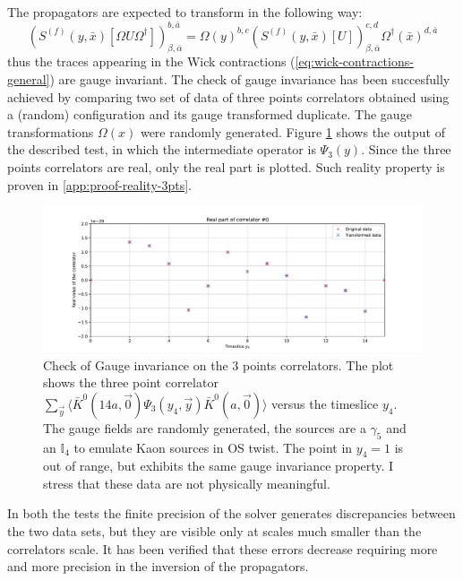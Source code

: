 \documentclass[english, LaM, oneside, noexaminfo]{sapthesis}
\newcommand{\la}{\langle}
\newcommand{\ra}{\rangle}
\begin{document}
The propagators are expected to transform in the following way:
\begin{equation*}
    \left(S^{(f)}(y, \bar x)[\Omega U \Omega^\dagger]\right)^{b,\bar a}_{\beta, \bar \alpha} = \Omega (y)^{b,c} \left(S^{(f)}(y, \bar x)[U]\right)^{c,d}_{\beta, \bar \alpha} \Omega^\dagger (\bar x)^{d,\bar a}
\end{equation*}
thus the traces appearing in the Wick contractions (\ref{eq:wick-contractions-general}) are gauge invariant.
The check of gauge invariance has been succesfully achieved by comparing two set of data of three points correlators obtained using a (random) configuration and its gauge transformed duplicate.
The gauge transformations $\Omega (x)$ were randomly generated.
Figure \ref{fig:check1} shows the output of the described test, in which the intermediate operator is $\Psi_3 (y)$.
Since the three points correlators are real, only the real part is plotted.
Such reality property is proven in \ref{app:proof-reality-3pts}.
\begin{figure}[h!]
    \centering
    \includegraphics[width=\textwidth]{imgs-MSc-thesis/check1.pdf}
    \caption{Check of Gauge invariance on the 3 points correlators.
        The plot shows the three point correlator $\sum_{\vec y} \la \bar K^0 (14a,\vec 0) \Psi_3 (y_4, \vec y) \bar K^0 (a,\vec 0) \ra$ versus the timeslice $y_4$.
        The gauge fields are randomly generated, the sources are a $\gamma_5$ and an $\mathbb{I}_4$ to emulate Kaon sources in OS twist.
        The point in $y_4=1$ is out of range, but exhibits the same gauge invariance property.
        I stress that these data are not physically meaningful.}
    \label{fig:check1}
\end{figure}
\newline
In both the tests the finite precision of the solver generates discrepancies between the two data sets, but they are visible only at scales much smaller than the correlators scale.
It has been verified that these errors decrease requiring more and more precision in the inversion of the propagators.
\end{document}
